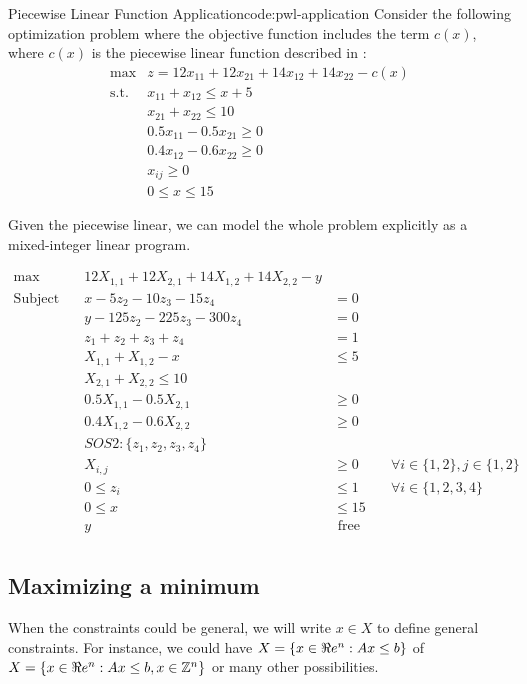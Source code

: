 \begin{examplewithcode}{Piecewise Linear Function Application}{code:pwl-application}
\label{example:pwl-application}
Consider the following optimization problem where the objective function includes the term $c(x)$, where $c(x)$ is the piecewise linear function described in :
\begin{align}
\max & z = 12x_{11} + 12x_{21} + 14x_{12} + 14x_{22} - c(x)\\
\text{s.t.} & x_{11} + x_{12} \leq x + 5\\
& x_{21} + x_{22} \leq 10\\
& 0.5 x_{11} - 0.5x_{21} \geq 0\\
& 0.4 x_{12} - 0.6 x_{22} \geq 0\\
& x_{ij} \geq 0\\
& 0 \leq x \leq 15
\end{align}

Given the piecewise linear, we can model the whole problem explicitly as a mixed-integer linear program.

 \begin{equation}
 \begin{array}{rrlr}
 \max\quad & 12 X_{1,1} + 12 X_{2,1} + 14 X_{1,2} + 14 X_{2,2} - y\\
\text{Subject to} \quad & x - 5 z_{2} - 10 z_{3} - 15 z_{4} &= 0\\
 & y - 125 z_{2} - 225 z_{3} - 300 z_{4} &= 0\\
 & z_{1} + z_{2} + z_{3} + z_{4} &= 1\\
 & X_{1,1} + X_{1,2} - x &\leq 5\\
 & X_{2,1} + X_{2,2} \leq 10\\
 & 0.5 X_{1,1} - 0.5 X_{2,1} &\geq 0\\
 & 0.4 X_{1,2} - 0.6 X_{2,2} &\geq 0\\
 & SOS2: \{z_1, z_2, z_3, z_4\}\\
 & X_{i,j} &\geq 0 &\quad\forall i \in \{1,2\}, j \in \{1,2\}\\
 & 0 \leq z_{i} &\leq 1 &\quad\forall i \in \{1,2,3,4\}\\
 & 0 \leq x &\leq 15\\
 & y & \text{ free} \\
\end{array}
\end{equation}
\end{examplewithcode}


\subsection{Maximizing a minimum}
When the constraints could be general, we will write $x \in X$ to define general constraints.  For instance, we could have $X = \{ x \in \Re e^n : Ax \leq b\}$ of $X  = \{ x \in \Re e^n : Ax \leq b, x \in {\mathbb{Z}}^n\}$ or many other possibilities.  


